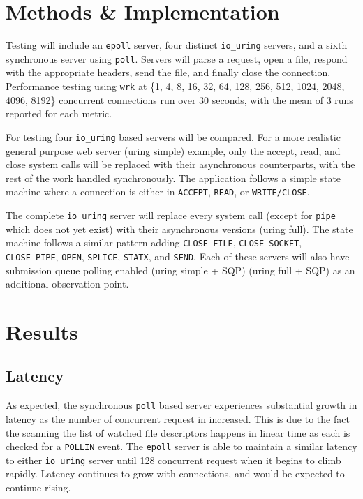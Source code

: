 \documentclass[letterpaper, 10pt, twocolumn]{article}
\begin{document}
\section{Methods \& Implementation}
\label{sec:org91cfefb}
Testing will include an \texttt{epoll} server, four distinct \texttt{io\_uring} servers, and a sixth synchronous server using \texttt{poll}. Servers will parse a request, open a file, respond with the appropriate headers, send the file, and finally close the connection. Performance testing using \texttt{wrk} at \{1, 4, 8, 16, 32, 64, 128, 256, 512, 1024, 2048, 4096, 8192\} concurrent connections run over 30 seconds, with the mean of 3 runs reported for each metric.

For testing four \texttt{io\_uring} based servers will be compared. For a more realistic general purpose web server (uring simple) example, only the accept, read, and close system calls will be replaced with their asynchronous counterparts, with the rest of the work handled synchronously. The application follows a simple state machine where a connection is either in \texttt{ACCEPT}, \texttt{READ}, or \texttt{WRITE/CLOSE}.

The complete \texttt{io\_uring} server will replace every system call (except for \texttt{pipe} which does not yet exist) with their asynchronous versions (uring full). The state machine follows a similar pattern adding \texttt{CLOSE\_FILE}, \texttt{CLOSE\_SOCKET}, \texttt{CLOSE\_PIPE}, \texttt{OPEN}, \texttt{SPLICE}, \texttt{STATX}, and \texttt{SEND}. Each of these servers will also have submission queue polling enabled (uring simple + SQP) (uring full + SQP) as an additional observation point. 

\section{Results}
\label{sec:org803a840}
\subsection{Latency}
\label{sec:orged662c2}
As expected, the synchronous \texttt{poll} based server experiences substantial growth in latency as the number of concurrent request in increased. This is due to the fact the scanning the list of watched file descriptors happens in linear time as each is checked for a \texttt{POLLIN} event. The \texttt{epoll} server is able to maintain a similar latency to either \texttt{io\_uring} server until 128 concurrent request when it begins to climb rapidly. Latency continues to grow with connections, and would be expected to continue rising.
\end{document}
